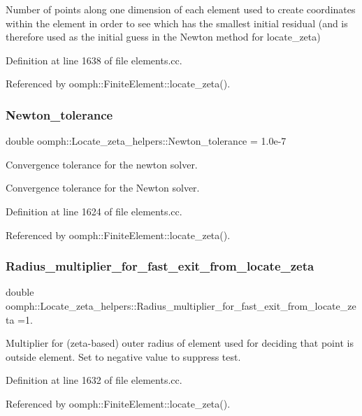 Number of points along one dimension of each element used to create coordinates within the element in order to see which has the smallest initial residual (and is therefore used as the initial guess in the Newton method for locate\+\_\+zeta) 

Definition at line 1638 of file elements.\+cc.



Referenced by oomph\+::\+Finite\+Element\+::locate\+\_\+zeta().

\mbox{\label{namespaceoomph_1_1Locate__zeta__helpers_ad78a9bb56905a77e0bb9486ba3fac6b3}} 
\subsubsection{\texorpdfstring{Newton\+\_\+tolerance}{Newton\_tolerance}}
{\footnotesize\ttfamily double oomph\+::\+Locate\+\_\+zeta\+\_\+helpers\+::\+Newton\+\_\+tolerance = 1.\+0e-\/7}



Convergence tolerance for the newton solver. 

Convergence tolerance for the Newton solver. 

Definition at line 1624 of file elements.\+cc.



Referenced by oomph\+::\+Finite\+Element\+::locate\+\_\+zeta().

\mbox{\label{namespaceoomph_1_1Locate__zeta__helpers_add7a14717af82a04aea106aa76fa1a94}} 
\subsubsection{\texorpdfstring{Radius\+\_\+multiplier\+\_\+for\+\_\+fast\+\_\+exit\+\_\+from\+\_\+locate\+\_\+zeta}{Radius\_multiplier\_for\_fast\_exit\_from\_locate\_zeta}}
{\footnotesize\ttfamily double oomph\+::\+Locate\+\_\+zeta\+\_\+helpers\+::\+Radius\+\_\+multiplier\+\_\+for\+\_\+fast\+\_\+exit\+\_\+from\+\_\+locate\+\_\+zeta =1.}



Multiplier for (zeta-\/based) outer radius of element used for deciding that point is outside element. Set to negative value to suppress test. 



Definition at line 1632 of file elements.\+cc.



Referenced by oomph\+::\+Finite\+Element\+::locate\+\_\+zeta().

